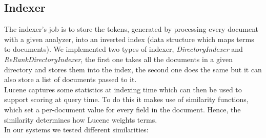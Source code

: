 \subsection{Indexer}
\label{subsec:indexer}
The indexer's job is to store the tokens, generated by processing every document with a given analyzer, into an inverted index (data structure which maps terms to documents).
We implemented two types of indexer, \textit{DirectoryIndexer} and \textit{ReRankDirectoryIndexer}, the first one takes all the documents in a given directory and stores them into the index, the second one does the same but it can also store a list of documents passed to it.
\\
Lucene captures some statistics at indexing time which can then be used to support scoring at query time. To do this it makes use of similarity functions, which set a per-document value for every field in the document. Hence, the similarity determines how Lucene weights terms.
\\
In our systems we tested different similarities:

